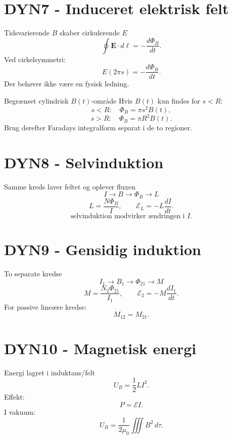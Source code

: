 \documentclass[10pt,a4paper]{article}
\begin{document}
\section*{DYN7 - Induceret elektrisk felt}
{}
\begin{casebox}{Tidsvarierende $B$ skaber cirkulerende $E$}
\[
\boxed{\oint\mathbf E\cdot d\boldsymbol\ell=-\frac{d\Phi_B}{dt}}.
\]
Ved cirkelsymmetri:
\[
\boxed{E(2\pi s)=-\frac{d\Phi_B}{dt}}.
\]
Der behøver ikke være en fysisk ledning.
\end{casebox}
\begin{casebox}{Begrænset cylindrisk $B(t)$-område}
Hvis $B(t)$ kun findes for $s<R$:
\[
s<R:\quad \Phi_B=\pi s^2B(t),
\]
\[
s>R:\quad \Phi_B=\pi R^2B(t).
\]
Brug derefter Faradays integralform separat i de to regioner.
\end{casebox}

\newpage
\section*{DYN8 - Selvinduktion}
{}
\begin{casebox}{Samme kreds laver feltet og oplever fluxen}
\[
\boxed{I\to B\to\Phi_B\to L}
\]
\[
\boxed{L=\frac{N\Phi_B}{I}},
\qquad
\boxed{\mathcal E_L=-L\frac{dI}{dt}}.
\]
\[
\boxed{\text{selvinduktion modvirker ændringen i }I}.
\]
\end{casebox}

\section*{DYN9 - Gensidig induktion}
{}
\begin{casebox}{To separate kredse}
\[
\boxed{I_1\to B_1\to\Phi_{21}\to M}
\]
\[
\boxed{M=\frac{N_2\Phi_{21}}{I_1}},
\qquad
\boxed{\mathcal E_2=-M\frac{dI_1}{dt}}.
\]
For passive lineære kredse:
\[
M_{12}=M_{21}.
\]
\end{casebox}

\section*{DYN10 - Magnetisk energi}
{}
\begin{casebox}{Energi lagret i induktans/felt}
\[
\boxed{U_B=\frac12LI^2}.
\]
Effekt:
\[
\boxed{P=\mathcal E I}.
\]
I vakuum:
\[
\boxed{U_B=\frac1{2\mu_0}\iiint B^2\,d\tau}.
\]
\end{casebox}
\end{document}
